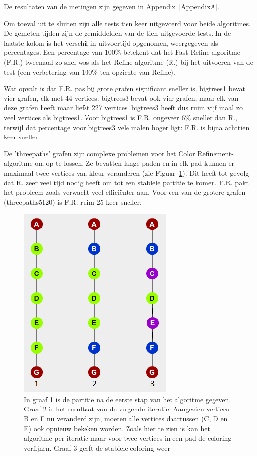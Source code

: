 \documentclass[twoside]{article}
\begin{document}
\begin{multicols}{2}
De resultaten van de metingen zijn gegeven in Appendix~\ref{AppendixA}.

Om toeval uit te sluiten zijn alle tests tien keer uitgevoerd voor beide algoritmes. De gemeten tijden zijn de gemiddelden van de tien uitgevoerde tests. In de laatste kolom is het verschil in uitvoertijd opgenomen, weergegeven als percentages. Een percentage van $100$\% betekent dat het Fast Refine-algoritme (F.R.) tweemaal zo snel was als het Refine-algoritme (R.) bij het uitvoeren van de test (een verbetering van $100$\% ten opzichte van Refine).

Wat opvalt is dat F.R. pas bij grote grafen significant sneller is. bigtrees1 bevat vier grafen, elk met 44 vertices. bigtrees3 bevat ook vier grafen, maar elk van deze grafen heeft maar liefst 227 vertices. bigtrees3 heeft dus ruim vijf maal zo veel vertices als bigtrees1. Voor bigtrees1 is F.R. ongeveer 6\% sneller dan R., terwijl dat percentage voor bigtrees3 vele malen hoger ligt: F.R. is bijna achttien keer sneller.

De 'threepaths' grafen zijn complexe problemen voor het Color Refinement-algoritme om op te lossen. Ze bevatten lange paden en in elk pad kunnen er maximaal twee vertices van kleur veranderen (zie Figuur~\ref{paths}). Dit heeft tot gevolg dat R. zeer veel tijd nodig heeft om tot een stabiele partitie te komen. F.R. pakt het probleem zoals verwacht veel efficiënter aan. Voor een van de grotere grafen (threepaths5120) is F.R. ruim 25 keer sneller.

\begin{figure}[H]
\centering
\includegraphics[]{paths.png}
\caption{In graaf 1 is de partitie na de eerste stap van het algoritme gegeven. Graaf 2 is het resultaat van de volgende iteratie. Aangezien vertices B en F nu veranderd zijn, moeten alle vertices daartussen (C, D en E) ook opnieuw bekeken worden. Zoals hier te zien is kan het algoritme per iteratie maar voor twee vertices in een pad de coloring verfijnen. Graaf 3 geeft de stabiele coloring weer. \label{paths}}
\end{figure}



\end{multicols}
\end{document}
